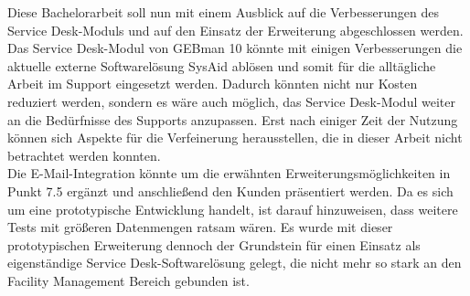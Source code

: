 \noindent
Diese Bachelorarbeit soll nun mit einem Ausblick auf die Verbesserungen des Service Desk-Moduls und auf den Einsatz der Erweiterung abgeschlossen werden. Das Service Desk-Modul von GEBman 10 könnte mit einigen Verbesserungen die aktuelle externe Softwarelösung SysAid ablösen und somit für die alltägliche Arbeit im Support eingesetzt werden. Dadurch könnten nicht nur Kosten reduziert werden, sondern es wäre auch möglich, das Service Desk-Modul weiter an die Bedürfnisse des Supports anzupassen. Erst nach einiger Zeit der Nutzung können sich Aspekte für die Verfeinerung herausstellen, die in dieser Arbeit nicht betrachtet werden konnten.\\

\noindent
Die E-Mail-Integration könnte um die erwähnten Erweiterungsmöglichkeiten in Punkt 7.5 ergänzt und anschließend den Kunden präsentiert werden. Da es sich um eine prototypische Entwicklung handelt, ist darauf hinzuweisen, dass weitere Tests mit größeren Datenmengen ratsam wären. Es wurde mit dieser prototypischen Erweiterung dennoch der Grundstein für einen Einsatz als eigenständige Service Desk-Softwarelösung gelegt, die nicht mehr so stark an den Facility Management Bereich gebunden ist.


